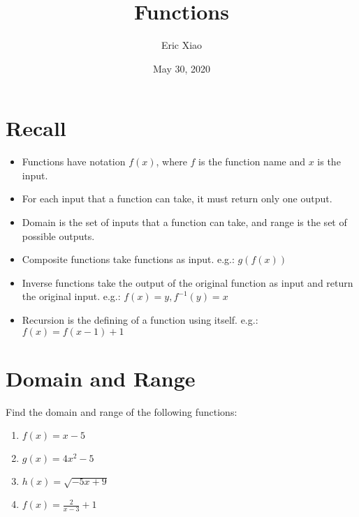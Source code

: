 \documentclass[12pt]{extarticle}
\title{Functions}
\author{Eric Xiao}
\date{May 30, 2020}
\newcommand{\R}{\mathbb{R}}
\begin{document}
\maketitle

\section{Recall}
\begin{itemize}
    \item {Functions have notation $f(x)$, where $f$ is the function name and $x$ is the input.}
    \item {For each input that a function can take, it must return only one output.}
    \item {Domain is the set of inputs that a function can take, and range is the set of possible outputs.}
    \item {Composite functions take functions as input. e.g.: $g(f(x))$}
    \item {Inverse functions take the output of the original function as input and return the original input. e.g.: $f(x) = y, f^{-1}(y) = x$}
    \item {Recursion is the defining of a function using itself. e.g.: $f(x) = f(x-1) + 1$}
\end{itemize}

\section{Domain and Range}
{Find the domain and range of the following functions:}
\begin{enumerate}
    \itemsep 2.0em
    \item {$f(x) = x - 5$} %
    \item {$g(x) = 4x^2 - 5$} %
    \item {$h(x) = \sqrt{-5x + 9}$} %
    \item {$f(x) = \frac{2}{x - 3} + 1$} %
\end{enumerate}
\end{document}
